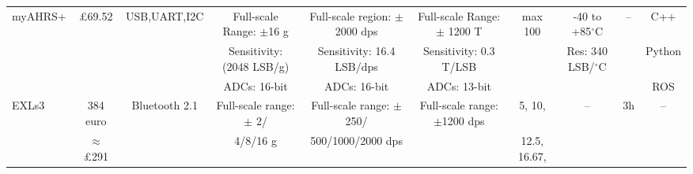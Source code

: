 \begin{landscape}
\begin{tabular}{l*{9}{c}}








     \hline
     myAHRS+ & \pounds 69.52 & USB,UART,I2C &  Full-scale Range: $\pm$16 g & Full-scale region: $\pm$2000 dps  &  Full-scale Range: $\pm$ 1200 T
     & max 100 & -40 to +85$^{\circ}$C   & -- & C++  \\

     & & & Sensitivity: (2048 LSB/g)   &  Sensitivity: 16.4 LSB/dps &  Sensitivity: 0.3 T/LSB & & Res: 340 LSB/$^{\circ}$C & &  Python  \\
     & &  &  ADCs: 16-bit  &  ADCs: 16-bit &  ADCs: 13-bit & & & & ROS \\












\hline
EXLs3 & 384 euro & Bluetooth 2.1 & Full-scale range: $\pm$ 2/ &  Full-scale range: $\pm$ 250/ & Full-scale range: $\pm$1200 dps
&  5, 10,  & -- & 3h & -- \\

& $\approx$ \pounds 291 &  & 4/8/16 g & 500/1000/2000 dps  &
& 12.5, 16.67,   & & & \\


\end{tabular}
\end{landscape}
